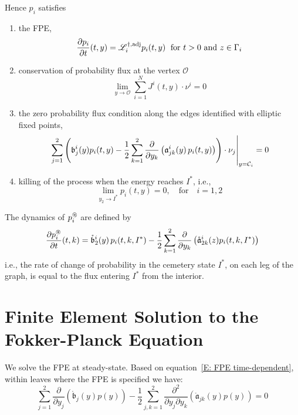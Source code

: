 Hence $p_i$ satisfies
\begin{enumerate}
\item the FPE,
\begin{equation}
\frac{\partial p_i}{\partial t}(t,y) = \mathscr L^{\dagger,\text{adj}}_{i} p_{i} (t,y) \; \text{ for } t > 0 \text{ and } z \in \Gamma_i
\label{E: FPE time-dependent}
\end{equation}

\item conservation of probability flux at the vertex $\mathcal{O}$
\begin{equation}
\lim_{y \to \mathcal O} \sum_{i = 1}^N J^i(t,y) \cdot \nu^i = 0
\label{E:cpfc}
\end{equation}

\item the zero probability flux condition along the edges identified with elliptic fixed points,
\begin{equation}
\eval{\sum_{j=1}^2 \left(\mathfrak b_j^i(y) p_i(t,y) - \frac12 \sum_{k=1}^2 \frac{\partial}{\partial y_k} \left(\Aa_{jk}^i(y)\,p_{i}(t,y)\right)\right) \cdot \nu_j}_{y = \bigc_i} = 0
\label{E:BC elliptic}
\end{equation}

\item killing of the process when the energy reaches $I^*$, i.e.,
\begin{equation}
\lim_{y_2 \to I^*} p_i(t,y) = 0, \quad \text{for} \quad
i=1,2
\label{E:BC upper}
\end{equation}
\end{enumerate}
The dynamics of $p_i^\circledast$ are defined by
\[
\frac{\partial p_{i}^\circledast}{\partial t}(t,k) = \mathring{\mathfrak{b}}_2^{i}(y)\,p_i(t,k,I^*) - \frac12 \sum_{k=1}^2
\frac{\partial}{\partial y_k} \left(\mathring{\mathfrak a}_{2k}^i(z) p_i(t,k,I^*)\right)
\]
i.e., the rate of change of probability in the cemetery state $I^*$, on each leg of the graph, is equal to the flux entering $I^*$ from the interior.

\section{Finite Element Solution to the Fokker-Planck Equation}

We solve the FPE at steady-state. Based on equation~\eqref{E: FPE time-dependent}, within leaves where the FPE is specified we have:
\begin{equation}
\label{E:FPE}
\sum_{j=1}^2 \frac{\partial}{\partial y_j}(\mathring{\mathfrak b}_j(y) p(y)) - \frac12 \sum_{j,k=1}^2 \frac{\partial^2}{\partial y_j \partial y_k} (\mathring{\mathfrak a}_{jk}(y) p(y)) = 0
\end{equation}

